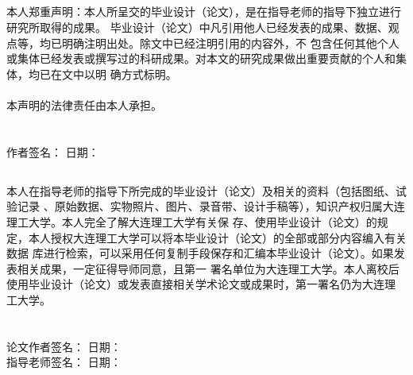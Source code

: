 	\newpage
	\begin{spacing}{2}
		\section*{\textbf{}}
	\end{spacing}
	\begin{spacing}{1.7}
	{ \songti   本人郑重声明：本人所呈交的毕业设计（论文），是在指导老师的指导下独立进行研究所取得的成果。
	毕业设计（论文）中凡引用他人已经发表的成果、数据、观点等，均已明确注明出处。除文中已经注明引用的内容外，不
	包含任何其他个人或集体已经发表或撰写过的科研成果。对本文的研究成果做出重要贡献的个人和集体，均已在文中以明
	确方式标明。\\
	~\\
	本声明的法律责任由本人承担。\\
	~\\
	~\\
	作者签名： \qquad \qquad \qquad \qquad \quad  日\quad 期：}
	\end{spacing}
	\newpage
	\begin{spacing}{2}
		\section*{\textbf{}}
	\end{spacing}
	\begin{spacing}{1.7}
		{ \songti 本人在指导老师的指导下所完成的毕业设计（论文）及相关的资料（包括图纸、试验记录
	、原始数据、实物照片、图片、录音带、设计手稿等），知识产权归属大连理工大学。本人完全了解大连理工大学有关保
	存、使用毕业设计（论文）的规定，本人授权大连理工大学可以将本毕业设计（论文）的全部或部分内容编入有关数据
	库进行检索，可以采用任何复制手段保存和汇编本毕业设计（论文）。如果发表相关成果，一定征得导师同意，且第一
	署名单位为大连理工大学。本人离校后使用毕业设计（论文）或发表直接相关学术论文或成果时，第一署名仍为大连理
	工大学。
	~\\
	~\\
	~\\
	论文作者签名： \quad \quad \quad \qquad \qquad \quad 日\quad 期：\\
	指导老师签名： \quad \quad \quad \qquad \qquad \quad 日\quad 期：}
	\end{spacing}
	\newpage
	
